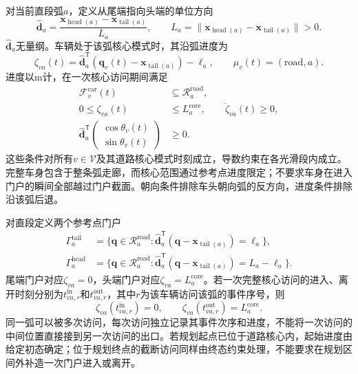 对当前直段弧$a$，定义从尾端指向头端的单位方向
\begin{equation}
 \widehat{\mathbf d}_a
 =\frac{\mathbf x_{\operatorname{head}(a)}
             -\mathbf x_{\operatorname{tail}(a)}}{L_a},
 \qquad
 L_a=\|\mathbf x_{\operatorname{head}(a)}
             -\mathbf x_{\operatorname{tail}(a)}\|>0.
 \label{s0407:arc_direction}
\end{equation}
$\widehat{\mathbf d}_a$无量纲。车辆处于该弧核心模式时，其沿弧进度为
\begin{equation}
 \zeta_{va}(t)
 =\widehat{\mathbf d}_a^{\mathsf T}
       (\mathbf q_v(t)-\mathbf x_{\operatorname{tail}(a)})
       -\ell_a,
 \qquad \mu_v(t)=(\mathrm{road},a).
 \label{s0407:core_progress}
\end{equation}
进度以$\mathrm m$计，在一次核心访问期间满足
\begin{subequations}
\label{s0407:road_mode_constraints}
\begin{align}
 \mathcal F_v^{\mathrm{car}}(t)
 &\subseteq\mathcal R_a^{\mathrm{road}},
 \label{s0407:road_body_containment}\\
 0\le\zeta_{va}(t)&\le L_a^{\mathrm{core}},
 \qquad \dot\zeta_{va}(t)\ge0,
 \label{s0407:monotone_progress}\\
 \widehat{\mathbf d}_a^{\mathsf T}
 \begin{pmatrix}\cos\theta_v(t)\\\sin\theta_v(t)\end{pmatrix}
 &\ge0.
 \label{s0407:directed_heading}
\end{align}
\end{subequations}
这些条件对所有$v\in\mathcal V$及其道路核心模式时刻成立，导数约束在各光滑段内成立。完整车身包含于整条弧走廊，而核心范围通过参考点进度限定；不要求车身在进入门户的瞬间全部越过门户截面。朝向条件排除车头朝向弧的反方向，进度条件排除沿该弧后退。

对直段定义两个参考点门户
\begin{align}
 \Gamma_a^{\mathrm{tail}}
 &=\{\mathbf q\in\mathcal R_a^{\mathrm{road}}:
 \widehat{\mathbf d}_a^{\mathsf T}
 (\mathbf q-\mathbf x_{\operatorname{tail}(a)})=\ell_a\},
 \label{s0407:tail_portal}\\
 \Gamma_a^{\mathrm{head}}
 &=\{\mathbf q\in\mathcal R_a^{\mathrm{road}}:
 \widehat{\mathbf d}_a^{\mathsf T}
 (\mathbf q-\mathbf x_{\operatorname{tail}(a)})=L_a-\ell_a\}.
 \label{s0407:head_portal}
\end{align}
尾端门户对应$\zeta_{va}=0$，头端门户对应$\zeta_{va}=L_a^{\mathrm{core}}$。若一次完整核心访问的进入、离开时刻分别为$t_{va,r}^{\mathrm{in}}$和$t_{va,r}^{\mathrm{out}}$，其中$r$为该车辆访问该弧的事件序号，则
\begin{equation}
 \zeta_{va}(t_{va,r}^{\mathrm{in}})=0,\qquad
 \zeta_{va}(t_{va,r}^{\mathrm{out}})=L_a^{\mathrm{core}}.
 \label{s0407:visit_portal_conditions}
\end{equation}
同一弧可以被多次访问，每次访问独立记录其事件次序和进度，不能将一次访问的中间位置直接接到另一次访问的出口。若规划起点已位于道路核心内，起始进度由给定初态确定；位于规划终点的截断访问同样由终态约束处理，不能要求在规划区间外补造一次门户进入或离开。

